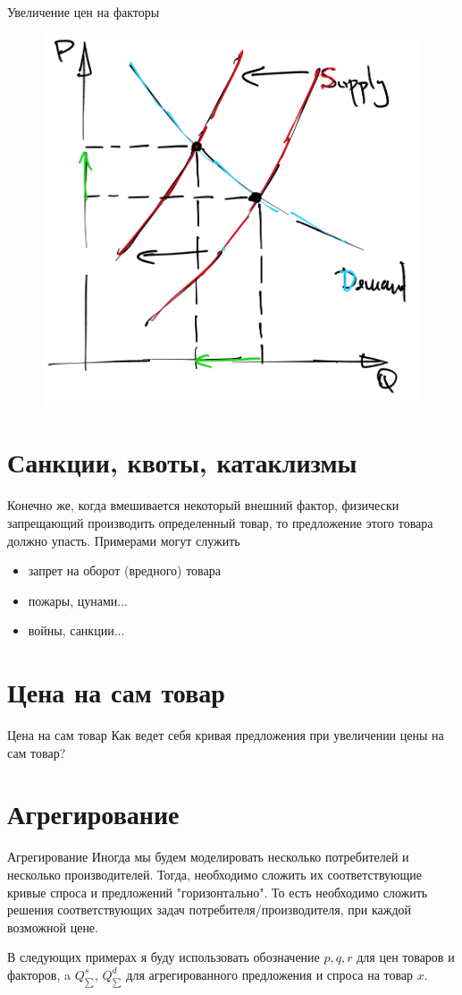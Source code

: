 \documentclass{beamer}
\begin{document}
\begin{frame}{Увеличение цен на факторы}
\begin{figure}[hbt]
\centering
\includegraphics[width=.7 \textwidth]{sup_contract.png}
\end{figure}
\end{frame}

\section{Санкции, квоты, катаклизмы}
\begin{frame}

Конечно же, когда вмешивается некоторый внешний фактор, физически запрещающий производить определенный товар, то предложение этого товара должно упасть. Примерами могут служить
\begin{itemize}
\item запрет на оборот (вредного) товара
\item пожары, цунами...
\item войны, санкции...
\end{itemize}
\end{frame}


\section{Цена на сам товар}
\begin{frame}{Цена на сам товар}
Как ведет себя кривая предложения при увеличении цены на сам товар?
\end{frame}

\section{Агрегирование}
\begin{frame}{Агрегирование}
Иногда мы будем моделировать несколько потребителей и несколько производителей. Тогда, необходимо сложить их соответствующие кривые спроса и предложений "горизонтально". То есть необходимо сложить решения соответствующих задач потребителя/производителя, при каждой возможной цене.

В следующих примерах я буду использовать обозначение $p,q,r$ для цен товаров и факторов, a $Q^s_{\sum}$, $Q^d_{\sum}$ для агрегированного предложения и спроса на товар $x$.
\end{frame}
\end{document}
